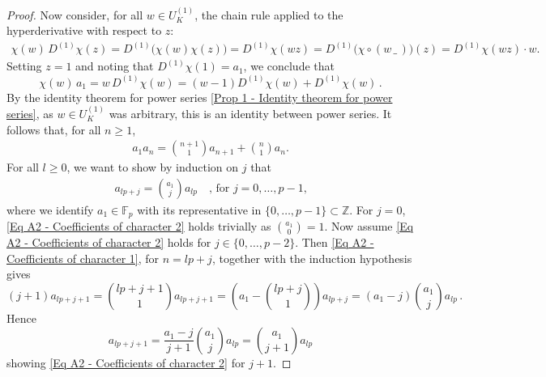 \documentclass[a4paper, reqno, 10pt]{amsart}
\theoremstyle{definition}
\numberwithin{equation}{section}
\newcommand{\blank}{{\,\_\,}}
\newcommand{\BF}{{\mathbb {F}}}
\newcommand{\BZ}{{\mathbb {Z}}}
\begin{document}
\begin{proof}
	
	Now consider, for all $w\in U_K^{(1)}$, the chain rule applied to the hyperderivative with respect to $z$: 
	\begin{align*}
		\chi(w) \, D^{(1)} \chi (z) = D^{(1)} \big( \chi(w)\chi(z) \big) 	
		=D^{(1)} \chi(wz)
		=D^{(1)}\big( \chi \circ (w\blank)\big) (z) 
		=D^{(1)}\chi(wz) \cdot w			 .
	\end{align*}
	Setting $z=1$ and noting that $D^{(1)} \chi (1)=a_1$, we conclude that
	\[\chi(w)\, a_1 = w \, D^{(1)} \chi (w) = (w-1)D^{(1)}\chi(w)+ D^{(1)}\chi(w) \, .\]
	By the identity theorem for power series \ref{Prop 1 - Identity theorem for power series}, as $w\in U_K^{(1)}$ was arbitrary, this is an identity between power series.
	It follows that, for all $n\geq 1$,
	\begin{align}\label{Eq A2 - Coefficients of character 1}
		a_1 a_n = \binom{n+1}{1} a_{n+1} + \binom{n}{1} a_n  .
	\end{align}
	For all $l \geq 0$, we want to show by induction on $j$ that
	\begin{align}\label{Eq A2 - Coefficients of character 2}
		a_{lp +j} = \binom{a_1}{j} a_{lp}  \quad\text{, for $j=0,\ldots,p-1$,} 
	\end{align}
	where we identify $a_1\in \BF_p$ with its representative in $\{0,\ldots,p-1\} \subset \BZ$.
	For $j=0$, \eqref{Eq A2 - Coefficients of character 2} holds trivially as $\binom{a_1}{0}=1$.
	Now assume \eqref{Eq A2 - Coefficients of character 2} holds for $j\in \{0,\ldots,p-2\}$.
	Then \eqref{Eq A2 - Coefficients of character 1}, for $n=lp + j$, together with the induction hypothesis gives
	\[(j+1)a_{lp+j+1} = \binom{lp +j+1}{1} a_{lp + j +1} = \left(a_1 -\binom{lp+j}{1}\right) a_{lp+j} = (a_1 - j) \binom{a_1}{j} a_{lp} \, . \]
	Hence 
	\[a_{lp+j+1} = \frac{a_1-j}{j+1} \binom{a_1}{j} a_{lp} = \binom{a_1}{j+1} a_{lp} \]
	showing \eqref{Eq A2 - Coefficients of character 2} for $j+1$.
	

\end{proof}
\end{document}
